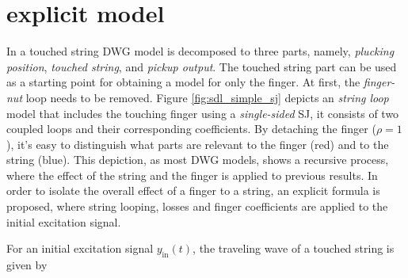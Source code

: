 \documentclass{sigchi}
\begin{document}
\section{explicit model}
In \cite{pakarinen_physical_2005} a touched string DWG model is decomposed to three parts, namely, \textit{plucking position}, \textit{touched string}, and \textit{pickup output}.
The touched string part can be used as a starting point for obtaining a model for only the finger.
At first, the \textit{finger-nut} loop needs to be removed. Figure \ref{fig:sdl_simple_sj} depicts an \textit{string loop} model that includes the touching finger using a \textit{single-sided} SJ, it consists of two coupled loops and their corresponding coefficients.
By detaching the finger ($\rho = 1$), it's easy to distinguish what parts are relevant to the finger (red) and to the string (blue).
This depiction, as most DWG models, shows a recursive process, where the effect of the string and the finger is applied to previous results.
In order to isolate the overall effect of a finger to a string, an explicit formula is proposed, where string looping, losses and finger coefficients are applied to the initial excitation signal.

\begin{figure*}[h]
	\centering
	\scalebox{0.8}{}
	\caption{String loop with a scattering junction. $N$-roundtrip (blue), $F$-roundtrip (red)}
	\label{fig:sdl_simple_sj}
\end{figure*}


For an initial excitation signal $y_{\textrm{in}}(t)$, the traveling wave of a touched string is given by
\end{document}
